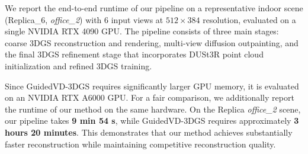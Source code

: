 \begin{figure}
    \vspace{-25pt}
    \centering
    \footnotesize
    \setlength{\abovecaptionskip}{0pt}
    \setlength{\belowcaptionskip}{2pt}
    \label{tab:runtime}
    \vspace{4pt}
    \label{tab:runtime_a6000}
    \vspace{-30pt}
\end{figure}

We report the end-to-end runtime of our pipeline on a representative indoor scene (Replica\_6, \textit{office\_2}) with 6 input views at $512 \times 384$ resolution, evaluated on a single NVIDIA RTX 4090 GPU. The pipeline consists of three main stages: coarse 3DGS reconstruction and rendering, multi-view diffusion outpainting, and the final 3DGS refinement stage that incorporates DUSt3R point cloud initialization and refined 3DGS training.

Since GuidedVD-3DGS requires significantly larger GPU memory, it is evaluated on an NVIDIA RTX A6000 GPU. For a fair comparison, we additionally report the runtime of our method on the same hardware. On the Replica \textit{office\_2} scene, our pipeline takes \textbf{9 min 54 s}, while GuidedVD-3DGS requires approximately \textbf{3 hours 20 minutes}. This demonstrates that our method achieves substantially faster reconstruction while maintaining competitive reconstruction quality.



